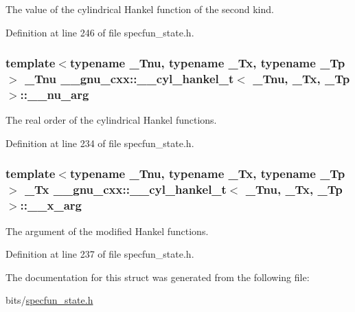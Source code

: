 The value of the cylindrical Hankel function of the second kind. 



Definition at line 246 of file specfun\+\_\+state.\+h.

\subsubsection[{\texorpdfstring{\+\_\+\+\_\+nu\+\_\+arg}{__nu_arg}}]{\setlength{\rightskip}{0pt plus 5cm}template$<$typename \+\_\+\+Tnu, typename \+\_\+\+Tx, typename \+\_\+\+Tp$>$ \+\_\+\+Tnu {\bf \+\_\+\+\_\+gnu\+\_\+cxx\+::\+\_\+\+\_\+cyl\+\_\+hankel\+\_\+t}$<$ \+\_\+\+Tnu, \+\_\+\+Tx, \+\_\+\+Tp $>$\+::\+\_\+\+\_\+nu\+\_\+arg}\hypertarget{struct____gnu__cxx_1_1____cyl__hankel__t_a67499e047360bcfc7c84f0e3c1d36dab}{}\label{struct____gnu__cxx_1_1____cyl__hankel__t_a67499e047360bcfc7c84f0e3c1d36dab}


The real order of the cylindrical Hankel functions. 



Definition at line 234 of file specfun\+\_\+state.\+h.

\subsubsection[{\texorpdfstring{\+\_\+\+\_\+x\+\_\+arg}{__x_arg}}]{\setlength{\rightskip}{0pt plus 5cm}template$<$typename \+\_\+\+Tnu, typename \+\_\+\+Tx, typename \+\_\+\+Tp$>$ \+\_\+\+Tx {\bf \+\_\+\+\_\+gnu\+\_\+cxx\+::\+\_\+\+\_\+cyl\+\_\+hankel\+\_\+t}$<$ \+\_\+\+Tnu, \+\_\+\+Tx, \+\_\+\+Tp $>$\+::\+\_\+\+\_\+x\+\_\+arg}\hypertarget{struct____gnu__cxx_1_1____cyl__hankel__t_a7b1009ea94ea381fcae13abc9da8b9c6}{}\label{struct____gnu__cxx_1_1____cyl__hankel__t_a7b1009ea94ea381fcae13abc9da8b9c6}


The argument of the modified Hankel functions. 



Definition at line 237 of file specfun\+\_\+state.\+h.



The documentation for this struct was generated from the following file\+:\begin{DoxyCompactItemize}
\item 
bits/\hyperlink{specfun__state_8h}{specfun\+\_\+state.\+h}\end{DoxyCompactItemize}
